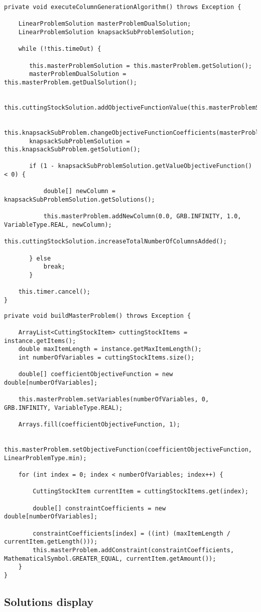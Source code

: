 \documentclass[10pt,a4paper]{article}
\begin{document}
\begin{lstlisting}[frame=lines, caption={\texttt{executeColumnGenerationAlgorithm()} method implementation.}, label={code:cga}]
private void executeColumnGenerationAlgorithm() throws Exception {

    LinearProblemSolution masterProblemDualSolution;
    LinearProblemSolution knapsackSubProblemSolution;

    while (!this.timeOut) {

       this.masterProblemSolution = this.masterProblem.getSolution();
       masterProblemDualSolution = this.masterProblem.getDualSolution();

       this.cuttingStockSolution.addObjectiveFunctionValue(this.masterProblemSolution.getValueObjectiveFunction());

       this.knapsackSubProblem.changeObjectiveFunctionCoefficients(masterProblemDualSolution.getSolutions());
       knapsackSubProblemSolution = this.knapsackSubProblem.getSolution();

       if (1 - knapsackSubProblemSolution.getValueObjectiveFunction() < 0) {

           double[] newColumn = knapsackSubProblemSolution.getSolutions();

           this.masterProblem.addNewColumn(0.0, GRB.INFINITY, 1.0, VariableType.REAL, newColumn);
           this.cuttingStockSolution.increaseTotalNumberOfColumnsAdded();

       } else
           break;
       }

    this.timer.cancel();
}
\end{lstlisting}

\begin{lstlisting}[frame=lines, caption={\texttt{buildMasterProblem()} method implementation.}, label={code:cga}]
private void buildMasterProblem() throws Exception {

    ArrayList<CuttingStockItem> cuttingStockItems = instance.getItems();
    double maxItemLength = instance.getMaxItemLength();
    int numberOfVariables = cuttingStockItems.size();

    double[] coefficientObjectiveFunction = new double[numberOfVariables];

    this.masterProblem.setVariables(numberOfVariables, 0, GRB.INFINITY, VariableType.REAL);

    Arrays.fill(coefficientObjectiveFunction, 1);

    this.masterProblem.setObjectiveFunction(coefficientObjectiveFunction, LinearProblemType.min);

    for (int index = 0; index < numberOfVariables; index++) {

        CuttingStockItem currentItem = cuttingStockItems.get(index);

        double[] constraintCoefficients = new double[numberOfVariables];

        constraintCoefficients[index] = ((int) (maxItemLength / currentItem.getLength()));
        this.masterProblem.addConstraint(constraintCoefficients, MathematicalSymbol.GREATER_EQUAL, currentItem.getAmount());
    }
}
\end{lstlisting}

\subsection{Solutions display}
\end{document}
